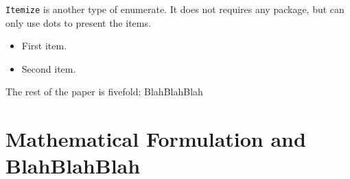 \documentclass[journal]{IEEEtran}
\begin{document}
\texttt{Itemize} is another type of enumerate. It does not requires any package, but can only use dots to present the items.
\begin{itemize}
\item First item.
\item Second item.
\end{itemize}
The rest of the paper is fivefold: BlahBlahBlah

\section{Mathematical Formulation and BlahBlahBlah}

\end{document}
